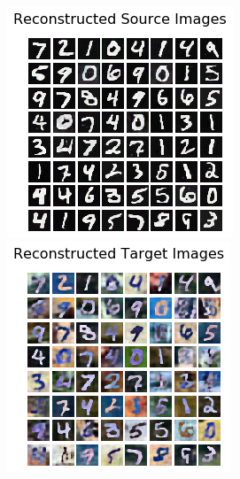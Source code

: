 \documentclass{article}
\begin{document}
\begin{figure}
\begin{minipage}[t]{0.5\textwidth}
\begin{minipage}[t]{0.48\textwidth}
    \end{minipage}
    \vspace{2mm}
    \begin{minipage}[t]{0.48\textwidth}
      \includegraphics[width=0.9\linewidth]{DSN/reconstructed_source.png}
    \end{minipage}
    \hfill
    \begin{minipage}[t]{0.48\textwidth}
      \includegraphics[width=0.9\linewidth]{DSN/reconstructed_target.png}
    \end{minipage}

  \end{minipage}
\end{figure}
\end{document}
